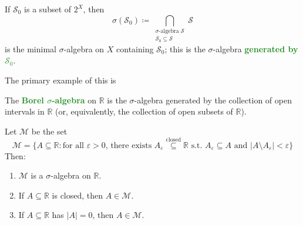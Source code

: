 \documentclass[11pt]{scrartcl}
\providecommand{\eps}{\varepsilon}
\providecommand{\RR}{\mathbb R}
\providecommand{\ii}{\item}
\providecommand{\vocab}[1]{{\textbf{\textcolor{ForestGreen}{#1}}}}
\providecommand{\abs}[1]{\left\lvert #1\right\rvert}
\begin{document}
\begin{corollary}
    \label{coro:generated-sigma-algebra}
    If $\mathcal S_0$ is a subset of $2^X$, then
    \begin{equation*}
	\sigma(\mathcal S_0)\coloneq
	\bigcap_{\substack{\text{$\sigma$-algebra }\mathcal S\\
	\mathcal S_0\subseteq\mathcal S}} \mathcal S
    \end{equation*}
    is the minimal $\sigma$-algebra on $X$ containing $\mathcal S_0$;
    this is the $\sigma$-algebra \vocab{generated by $\mathcal S_0$}.
\end{corollary}

The primary example of this is
\begin{definition}
    \label{def:borel-algebra}
    The \vocab{Borel $\sigma$-algebra} on $\RR$ is the
    $\sigma$-algebra generated by the collection of open intervals in $\RR$
    (or, equivalently, the collection of open subsets of $\RR$).
\end{definition}

\begin{prop}
    \label{prop:lebesgue-algebra}
    Let $\mathcal M$ be the set
    \begin{equation*}
	\mathcal M = \{ A\subseteq\RR :
	\text{for all }\eps > 0,\,\text{there exists }
	A_\eps\overset{\text{closed}}\subseteq\RR\text{ s.t. }
	A_\eps\subseteq A\text{ and }\abs{A\setminus A_\eps}<\eps
        \}
    \end{equation*}
    Then:
    \begin{enumerate}[(1)]
        \ii $\mathcal M$ is a $\sigma$-algebra on $\RR$.
	\ii If $A\subseteq\RR$ is closed, then $A\in\mathcal M$.
	\ii If $A\subseteq\RR$ has $\abs A = 0$, then $A\in\mathcal M$.
    \end{enumerate}
\end{prop}
\end{document}
